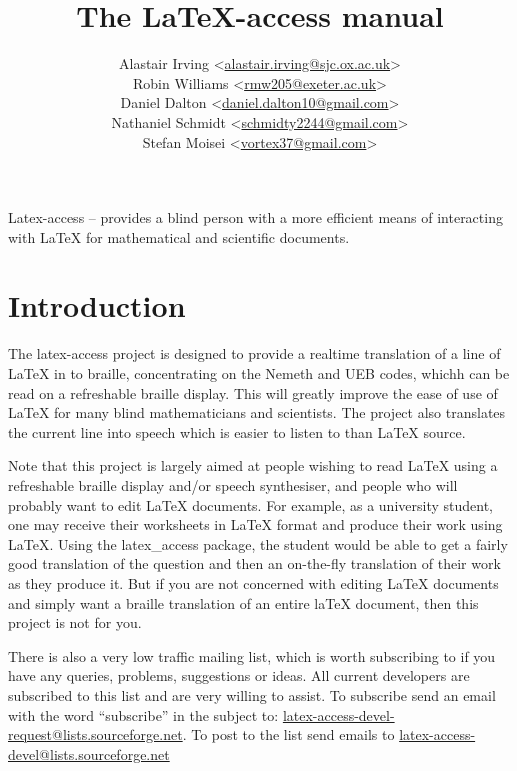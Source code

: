 \documentclass[12pt,a4paper]{report}
\title{The LaTeX-access manual}
\author{Alastair Irving <\href{mailto:alastair.irving@sjc.ox.ac.uk}{alastair.irving@sjc.ox.ac.uk}>\\
  Robin  Williams <\href{mailto:rmw205@exeter.ac.uk}{rmw205@exeter.ac.uk}>\\
  Daniel Dalton <\href{mailto:<daniel.dalton10@gmail.com}{daniel.dalton10@gmail.com}>\\
  Nathaniel Schmidt <\href{mailto:schmidty2244@gmail.com}{schmidty2244@gmail.com}>\\
  Stefan Moisei <\href{mailto:vortex37@gmail.com}{vortex37@gmail.com}>}
\begin{document}
\maketitle

\tableofcontents

Latex-access -- provides a blind person with a more efficient means of
interacting with LaTeX for mathematical and scientific documents.

\chapter{Introduction}
\label{ch-introduction}

The latex-access project is designed to provide a realtime
translation of a line of LaTeX in to braille, concentrating
on the Nemeth and UEB codes, whichh can be read on a refreshable braille
display. This will greatly improve the ease of use of
LaTeX for many blind mathematicians and scientists. The project also
translates the current line into speech which is
easier to listen to than LaTeX source.

Note that this project is largely aimed at people wishing
to read LaTeX using a refreshable braille display and/or
speech synthesiser, and people who will probably
want to edit LaTeX documents. For example, as a
university student,
one may receive their worksheets in LaTeX format and
produce their work using LaTeX. Using the latex\_access
package, the student would be able to
get a fairly good translation of the question
and then an on-the-fly translation of their work as
they produce it. But if you are
not concerned with editing LaTeX documents
and simply want a braille translation of an
entire laTeX document, then this
project is not for you.

There is also a very low traffic mailing list, which is worth subscribing to if you have any
queries, problems, suggestions or ideas. All current developers are
subscribed to this list and are very willing to assist. To subscribe
send an email with the word ``subscribe'' in the subject to:
\href{mailto:latex-access-devel-request@lists.sourceforge.net}{latex-access-devel-request@lists.sourceforge.net}. To
post to the list send emails to \href{mailto:latex-access-devel@lists.sourceforge.net}{latex-access-devel@lists.sourceforge.net}
\end{document}
